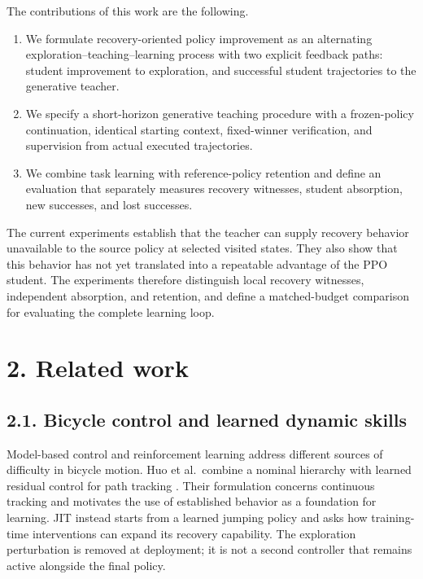 \documentclass[
  american,
  11pt,
  a4paper,
]{article}
\providecommand{\tightlist}{%
  \setlength{\itemsep}{0pt}\setlength{\parskip}{0pt}}
\begin{document}
The contributions of this work are the following.

\begin{enumerate}
\def\labelenumi{\arabic{enumi}.}
\tightlist
\item
  We formulate recovery-oriented policy improvement as an alternating
  exploration--teaching--learning process with two explicit feedback
  paths: student improvement to exploration, and successful student
  trajectories to the generative teacher.
\item
  We specify a short-horizon generative teaching procedure with a
  frozen-policy continuation, identical starting context, fixed-winner
  verification, and supervision from actual executed trajectories.
\item
  We combine task learning with reference-policy retention and define an
  evaluation that separately measures recovery witnesses, student
  absorption, new successes, and lost successes.
\end{enumerate}

The current experiments establish that the teacher can supply recovery
behavior unavailable to the source policy at selected visited states.
They also show that this behavior has not yet translated into a
repeatable advantage of the PPO student. The experiments therefore
distinguish local recovery witnesses, independent absorption, and
retention, and define a matched-budget comparison for evaluating the
complete learning loop.

\section{2. Related work}\label{related-work}

\subsection{2.1. Bicycle control and learned dynamic
skills}\label{bicycle-control-and-learned-dynamic-skills}

Model-based control and reinforcement learning address different sources
of difficulty in bicycle motion. Huo et al.~combine a nominal hierarchy
with learned residual control for path tracking \cite{huo2025hrrl}. Their
formulation concerns continuous tracking and motivates the use of
established behavior as a foundation for learning. JIT instead starts
from a learned jumping policy and asks how training-time interventions
can expand its recovery capability. The exploration perturbation is
removed at deployment; it is not a second controller that remains active
alongside the final policy.
\end{document}
